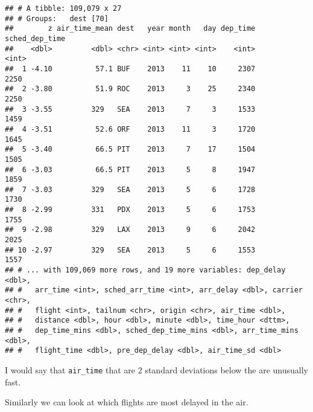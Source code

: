 \documentclass[]{article}
\newenvironment{Shaded}{\begin{snugshade}}{\end{snugshade}}
\newcommand{\KeywordTok}[1]{\textcolor[rgb]{0.13,0.29,0.53}{\textbf{#1}}}
\newcommand{\DataTypeTok}[1]{\textcolor[rgb]{0.13,0.29,0.53}{#1}}
\newcommand{\StringTok}[1]{\textcolor[rgb]{0.31,0.60,0.02}{#1}}
\newcommand{\OperatorTok}[1]{\textcolor[rgb]{0.81,0.36,0.00}{\textbf{#1}}}
\newcommand{\NormalTok}[1]{#1}
\theoremstyle{definition}
\theoremstyle{definition}
\theoremstyle{definition}
\theoremstyle{remark}
\begin{document}
\begin{verbatim}
## # A tibble: 109,079 x 27
## # Groups:   dest [70]
##        z air_time_mean dest   year month   day dep_time sched_dep_time
##    <dbl>         <dbl> <chr> <int> <int> <int>    <int>          <int>
##  1 -4.10          57.1 BUF    2013    11    10     2307           2250
##  2 -3.80          51.9 ROC    2013     3    25     2340           2250
##  3 -3.55         329   SEA    2013     7     3     1533           1459
##  4 -3.51          52.6 ORF    2013    11     3     1720           1645
##  5 -3.40          66.5 PIT    2013     7    17     1504           1505
##  6 -3.03          66.5 PIT    2013     5     8     1947           1859
##  7 -3.03         329   SEA    2013     5     6     1728           1730
##  8 -2.99         331   PDX    2013     5     6     1753           1755
##  9 -2.98         329   LAX    2013     9     6     2042           2025
## 10 -2.97         329   SEA    2013     5     6     1553           1557
## # ... with 109,069 more rows, and 19 more variables: dep_delay <dbl>,
## #   arr_time <int>, sched_arr_time <int>, arr_delay <dbl>, carrier <chr>,
## #   flight <int>, tailnum <chr>, origin <chr>, air_time <dbl>,
## #   distance <dbl>, hour <dbl>, minute <dbl>, time_hour <dttm>,
## #   dep_time_mins <dbl>, sched_dep_time_mins <dbl>, arr_time_mins <dbl>,
## #   flight_time <dbl>, pre_dep_delay <dbl>, air_time_sd <dbl>
\end{verbatim}

I would say that \texttt{air\_time} that are 2 standard deviations below
the are unusually fast.

Similarly we can look at which flights are most delayed in the air.

\begin{Shaded}
\end{Shaded}
\end{document}
